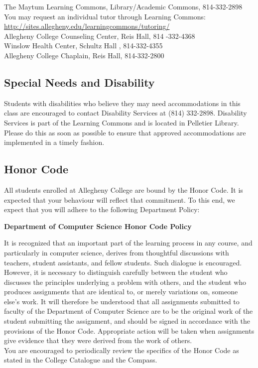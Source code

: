 \noindent The Maytum Learning Commons, Library/Academic Commons, 814-332-2898 \\
\noindent You may request an individual tutor through Learning Commons:\\ {\url{http://sites.allegheny.edu/learningcommons/tutoring/}}\\

\noindent Allegheny	College	Counseling	Center,	Reis 	Hall,	 814	-332-4368 \\

\noindent Winslow	Health	Center,	Schultz	Hall	, 814-332-4355 \\

\noindent Allegheny	College	Chaplain,	Reis	 Hall,	 814-332-2800

\subsection*{Special Needs and Disability}
Students with disabilities who believe they may need accommodations in this class are encouraged to contact Disability Services at (814) 332-2898. Disability Services is part of the Learning Commons and is located in Pelletier Library. Please do this as soon as possible to ensure that approved accommodations are implemented in a timely fashion.

\subsection*{Honor Code}
All students enrolled at Allegheny College are bound by the Honor Code. It is expected that
your behaviour will reflect that commitment. To this end, we expect that you will adhere to the 
following Department Policy:

\begin{center} \textbf{ Department of Computer Science Honor Code Policy } \end{center}
It is recognized that an important part of the learning process in any course, and particularly in computer science, derives from thoughtful discussions with teachers, student
assistants, and fellow students. Such dialogue is encouraged. However, it is necessary
to distinguish carefully between the student who discusses the principles underlying a
problem with others, and the student who produces assignments that are identical to,
or merely variations on, someone else's work. It will therefore be understood that all
assignments submitted to faculty of the Department of Computer Science are to be
the original work of the student submitting the assignment, and should be signed in
accordance with the provisions of the Honor Code.  Appropriate action will be taken when assignments give evidence that they were derived from the work of others.\\

\noindent You are encouraged to periodically review the specifics of the Honor Code as stated in the
College Catalogue and the Compass. 


